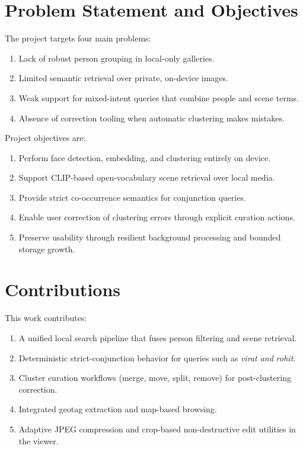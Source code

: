 \documentclass[conference]{IEEEtran}
\begin{document}
\section{Problem Statement and Objectives}
The project targets four main problems:
\begin{enumerate}
\item Lack of robust person grouping in local-only galleries.
\item Limited semantic retrieval over private, on-device images.
\item Weak support for mixed-intent queries that combine people and scene terms.
\item Absence of correction tooling when automatic clustering makes mistakes.
\end{enumerate}

Project objectives are:
\begin{enumerate}
\item Perform face detection, embedding, and clustering entirely on device.
\item Support CLIP-based open-vocabulary scene retrieval over local media.
\item Provide strict co-occurrence semantics for conjunction queries.
\item Enable user correction of clustering errors through explicit curation actions.
\item Preserve usability through resilient background processing and bounded storage growth.
\end{enumerate}

\section{Contributions}
This work contributes:
\begin{enumerate}
\item A unified local search pipeline that fuses person filtering and scene retrieval.
\item Deterministic strict-conjunction behavior for queries such as \textit{virat and rohit}.
\item Cluster curation workflows (merge, move, split, remove) for post-clustering correction.
\item Integrated geotag extraction and map-based browsing.
\item Adaptive JPEG compression and crop-based non-destructive edit utilities in the viewer.
\end{enumerate}
\end{document}
